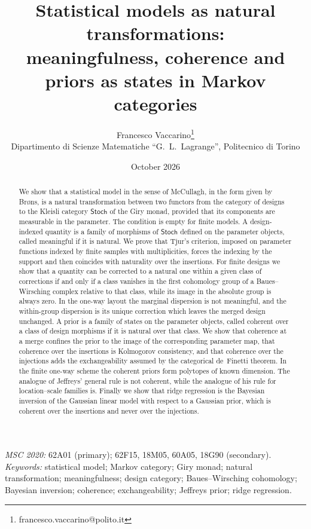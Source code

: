 \documentclass[11pt,a4paper]{article}
\title{Statistical models as natural transformations:\\
meaningfulness, coherence and priors as states in Markov categories}
\author{Francesco Vaccarino\footnote{francesco.vaccarino@polito.it}\\
\small Dipartimento di Scienze Matematiche ``G.\ L.\ Lagrange'', Politecnico di Torino}
\date{October 2026}
\theoremstyle{plain}
\theoremstyle{definition}
\theoremstyle{remark}
\newcommand{\cat}[1]{\mathsf{#1}}
\newcommand{\Stoch}{\cat{Stoch}}
\begin{document}
\maketitle

\begin{abstract}
\noindent
We show that a statistical model in the sense of McCullagh, in the form given
by Br\o ns, is a natural transformation between two functors from the category
of designs to the Kleisli category $\Stoch$ of the Giry monad, provided that
its components are measurable in the parameter. The condition is empty for
finite models. A design-indexed quantity is
a family of morphisms of $\Stoch$ defined on the parameter objects, called
meaningful if it is natural. We prove that Tjur's criterion, imposed on
parameter functions indexed by finite samples with multiplicities, forces the
indexing by the support and then coincides with naturality over the
insertions. For finite designs we show that a quantity
can be corrected to a natural one within a given class of corrections if and
only if a class vanishes in the first cohomology group of a Baues--Wirsching
complex relative to that class, while its image in the absolute group is
always zero. In the one-way layout the marginal dispersion is not meaningful,
and the within-group dispersion is its unique correction which leaves the
merged design unchanged. A prior is a family of states on the parameter
objects, called coherent over a class of design morphisms if it is natural
over that class. We show that coherence at a merge confines the prior
to the image of the corresponding parameter map, that coherence over the
insertions is Kolmogorov consistency, and that coherence over the injections
adds the exchangeability assumed by the categorical de~Finetti theorem. In the
finite one-way scheme the coherent priors form polytopes of known dimension. The analogue of Jeffreys' general rule is not coherent, while the
analogue of his rule for location--scale families is. Finally we show that
ridge regression is the Bayesian inversion of the Gaussian linear model with
respect to a Gaussian prior, which is coherent over the insertions and never
over the injections.
\end{abstract}

\medskip
\noindent\emph{MSC 2020:} 62A01 (primary); 62F15, 18M05, 60A05, 18G90 (secondary).\\
\emph{Keywords:} statistical model; Markov category; Giry monad; natural
transformation; meaningfulness; design category; Baues--Wirsching cohomology;
Bayesian inversion; coherence; exchangeability; Jeffreys prior; ridge
regression.
\end{document}
